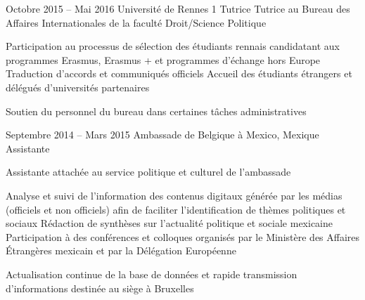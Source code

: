 \documentclass[30pt, french]{tccv}
\begin{document}
\begin{upshape}
\begin{experience}
\vspace{0.5cm}
\item{\color{text} Octobre 2015 -- Mai 2016}
     {Université de Rennes 1}
     {Tutrice}
     \fontsize{10pt}{1.1em}\color{text}\bodyfontlight\upshape\selectfont
{} Tutrice au Bureau des Affaires Internationales de la faculté Droit/Science Politique \\
\sloppy
{}%
    \setlength{\parskip}{-10pt}
    \begin{itemize}
      \cvitem[\checkmark] Participation au processus de sélection des étudiants rennais candidatant aux programmes Erasmus, Erasmus + et pro\-grammes d’échange hors Europe
      \cvitem[\checkmark] Traduction d’accords et communiqués officiels
      \cvitem[\checkmark] Accueil des étudiants étrangers et délégués d’uni\-ver\-sités par\-tenaires
    \end{itemize}     
 Soutien du personnel du bureau dans certaines tâches administratives 



\vspace{1.5cm}
\item{Septembre 2014 -- Mars 2015}
     {Ambassade de Belgique à Mexico, Mexique}
     {Assistante}
     \fontsize{10pt}{1.1em}\color{text}\bodyfontlight\upshape\selectfont

 Assistante attachée au service politique et culturel de l’ambassade \\
    \setlength{\parskip}{-10pt}
    \begin{itemize}
      \cvitem[\checkmark] Analyse et suivi de l’information des contenus digitaux générée par les médias (officiels et non officiels) afin de faciliter l’identification de thèmes politiques et sociaux 
      \cvitem[\checkmark] Rédaction de synthèses sur l’actualité politique et sociale mexicaine
      \cvitem[\checkmark] Participation à des conférences et colloques organisés par le Ministère des Affaires Étrangères mexicain et par la Délégation Européenne
    \end{itemize}     
 Actualisation continue de la base de données et rapide transmission d’informations destinée au siège à Bruxelles 


\end{experience}
\end{upshape}
\end{document}
